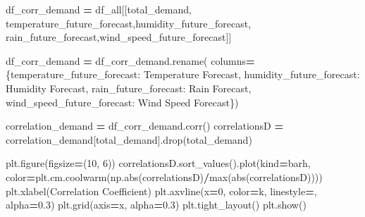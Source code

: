\documentclass[mstat,12pt]{unswthesis}
\newenvironment{Shaded}{\begin{snugshade}}{\end{snugshade}}
\newcommand{\BuiltInTok}[1]{#1}
\newcommand{\DecValTok}[1]{\textcolor[rgb]{0.00,0.00,0.81}{#1}}
\newcommand{\FloatTok}[1]{\textcolor[rgb]{0.00,0.00,0.81}{#1}}
\newcommand{\NormalTok}[1]{#1}
\newcommand{\OperatorTok}[1]{\textcolor[rgb]{0.81,0.36,0.00}{\textbf{#1}}}
\newcommand{\StringTok}[1]{\textcolor[rgb]{0.31,0.60,0.02}{#1}}
\begin{document}
\begin{Shaded}
\begin{Highlighting}[]
\NormalTok{df\_corr\_demand }\OperatorTok{=}\NormalTok{ df\_all[[}\StringTok{\textquotesingle{}total\_demand\textquotesingle{}}\NormalTok{, }
    \StringTok{\textquotesingle{}temperature\_future\_forecast\textquotesingle{}}\NormalTok{,}\StringTok{\textquotesingle{}humidity\_future\_forecast\textquotesingle{}}\NormalTok{,}
    \StringTok{\textquotesingle{}rain\_future\_forecast\textquotesingle{}}\NormalTok{,}\StringTok{\textquotesingle{}wind\_speed\_future\_forecast\textquotesingle{}}\NormalTok{]]}

\NormalTok{df\_corr\_demand }\OperatorTok{=}\NormalTok{ df\_corr\_demand.rename(}
\NormalTok{  columns}\OperatorTok{=}\NormalTok{\{}\StringTok{\textquotesingle{}temperature\_future\_forecast\textquotesingle{}}\NormalTok{: }\StringTok{\textquotesingle{}Temperature Forecast\textquotesingle{}}\NormalTok{, }
          \StringTok{\textquotesingle{}humidity\_future\_forecast\textquotesingle{}}\NormalTok{: }\StringTok{\textquotesingle{}Humidity Forecast\textquotesingle{}}\NormalTok{,}
          \StringTok{\textquotesingle{}rain\_future\_forecast\textquotesingle{}}\NormalTok{: }\StringTok{\textquotesingle{}Rain Forecast\textquotesingle{}}\NormalTok{,}
          \StringTok{\textquotesingle{}wind\_speed\_future\_forecast\textquotesingle{}}\NormalTok{: }\StringTok{\textquotesingle{}Wind Speed Forecast\textquotesingle{}}\NormalTok{\})}

\NormalTok{correlation\_demand }\OperatorTok{=}\NormalTok{ df\_corr\_demand.corr()}
\NormalTok{correlationsD }\OperatorTok{=}\NormalTok{ correlation\_demand[}\StringTok{\textquotesingle{}total\_demand\textquotesingle{}}\NormalTok{].drop(}\StringTok{\textquotesingle{}total\_demand\textquotesingle{}}\NormalTok{)}

\NormalTok{plt.figure(figsize}\OperatorTok{=}\NormalTok{(}\DecValTok{10}\NormalTok{, }\DecValTok{6}\NormalTok{))}
\NormalTok{correlationsD.sort\_values().plot(kind}\OperatorTok{=}\StringTok{\textquotesingle{}barh\textquotesingle{}}\NormalTok{, }
\NormalTok{    color}\OperatorTok{=}\NormalTok{plt.cm.coolwarm(np.}\BuiltInTok{abs}\NormalTok{(correlationsD)}\OperatorTok{/}\BuiltInTok{max}\NormalTok{(}\BuiltInTok{abs}\NormalTok{(correlationsD))))}
\NormalTok{plt.xlabel(}\StringTok{\textquotesingle{}Correlation Coefficient\textquotesingle{}}\NormalTok{)}
\NormalTok{plt.axvline(x}\OperatorTok{=}\DecValTok{0}\NormalTok{, color}\OperatorTok{=}\StringTok{\textquotesingle{}k\textquotesingle{}}\NormalTok{, linestyle}\OperatorTok{=}\StringTok{\textquotesingle{}{-}\textquotesingle{}}\NormalTok{, alpha}\OperatorTok{=}\FloatTok{0.3}\NormalTok{)}
\NormalTok{plt.grid(axis}\OperatorTok{=}\StringTok{\textquotesingle{}x\textquotesingle{}}\NormalTok{, alpha}\OperatorTok{=}\FloatTok{0.3}\NormalTok{)}
\NormalTok{plt.tight\_layout()}
\NormalTok{plt.show()}
\end{Highlighting}
\end{Shaded}
\end{document}
